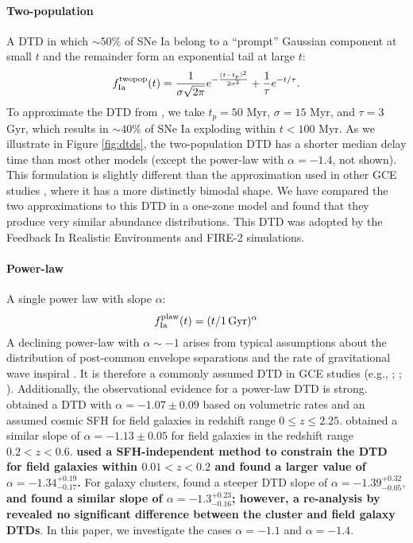\documentclass[twocolumn,twocolappendix,linenumbers]{aastex631}
\begin{document}
\paragraph{Two-population} A DTD in which $\sim50\%$ of SNe Ia belong to a ``prompt'' Gaussian component at small $t$ and the remainder form an exponential tail at large $t$:
\begin{equation}
    f_{\rm Ia}^{\rm twopop}(t) = \frac{1}{\sigma\sqrt{2\pi}} e^{-\frac{(t-t_p)^2}{2\sigma^2}} + \frac{1}{\tau} e^{-t/\tau}.
    \label{eq:prompt-dtd}
\end{equation}
To approximate the DTD from \citet{Mannucci2006-TwoPopulations}, we take $t_p=50$ Myr, $\sigma=15$ Myr, and $\tau=3$ Gyr, which results in $\sim 40\%$ of SNe Ia exploding within $t<100$ Myr. As we illustrate in Figure \ref{fig:dtds}, the two-population DTD has a shorter median delay time than most other models (except the power-law with $\alpha=-1.4$, not shown). This formulation is slightly different than the approximation used in other GCE studies \citep[e.g.,][]{Matteucci2006-BimodalDTDConsequences,Poulhazan2018-PrecisionPollution}, where it has a more distinctly bimodal shape. We have compared the two approximations to this DTD in a one-zone model and found that they produce very similar abundance distributions. This DTD was adopted by the Feedback In Realistic Environments \citep[FIRE;][]{Hopkins2014-FIRE-1} and FIRE-2 \citep{Hopkins2018-FIRE-2} simulations.

\paragraph{Power-law} A single power law with slope $\alpha$:
\begin{equation}
    f_{\rm Ia}^{\rm plaw}(t) = (t/1\,\rm{Gyr})^\alpha
    \label{eq:powerlaw-dtd}
\end{equation}
A declining power-law with $\alpha\sim-1$ {\bf \citep{Totani2008-DTD}} arises from typical assumptions about the distribution of post-common envelope separations and the rate of gravitational wave inspiral \citep[see Section 3.5 from][]{Maoz2014-Review}. It is therefore a commonly assumed DTD in GCE studies (e.g., \citealt{Rybizki2017-Chempy}; ; \citealt{Weinberg2023-CCSNYield}). Additionally, the observational evidence for a power-law DTD is strong. \citet{Maoz2017-CosmicDTD} obtained a DTD with $\alpha=-1.07\pm0.09$ based on volumetric rates and an assumed cosmic SFH for field galaxies in redshift range $0\leq z\leq 2.25$. \citet{Wiseman2021-DESRates} obtained a similar slope of $\alpha=-1.13\pm0.05$ for field galaxies in the redshift range $0.2<z<0.6$. {\bf \citet{Heringer2019-FieldGalaxyDTD} used a SFH-independent method to constrain the DTD for field galaxies within $0.01<z<0.2$ and found a larger value of $\alpha=-1.34^{+0.19}_{-0.17}$.} For galaxy clusters, \citet{Maoz2017-CosmicDTD} found a steeper DTD slope of $\alpha=-1.39^{+0.32}_{-0.05}$, {\bf and \citet{FriedmannMaoz2018-ClusterDTD} found a similar slope of $\alpha=-1.3^{+0.23}_{-0.16}$; however, a re-analysis by \citet{FreundlichMaoz2021-ClusterDTD} revealed no significant difference between the cluster and field galaxy DTDs}. In this paper, we investigate the cases $\alpha=-1.1$ and $\alpha=-1.4$.
\end{document}
